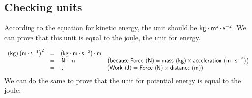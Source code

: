             \subsection*{Checking units}
            \nopagebreak
        \label{m38785*id67277}According to the equation for kinetic energy, the unit should be $\mathsf{kg}\ensuremath{\cdot}\mathsf{m}{}^{2}\ensuremath{\cdot}\mathsf{s}{}^{-2}$. We can prove that this unit is equal to the joule, the unit for energy.\par 
        \label{m38785*id67329}\nopagebreak\noindent{}
    \begin{equation}
    \begin{array}{cccc}\hfill \left(\mathsf{kg}\right){\left(\mathsf{m}\ensuremath{\cdot}{\mathsf{s}}^{-1}\right)}^{2}& =& \left(\mathsf{kg}\ensuremath{\cdot}\mathsf{m}\ensuremath{\cdot}{\mathsf{s}}^{-2}\right)\ensuremath{\cdot}\mathsf{m}\hfill & \\ & =& \phantom{\rule{0.166667em}{0ex}}\mathsf{N}\ensuremath{\cdot}\phantom{\rule{0.166667em}{0ex}}\mathsf{m}\hfill & \left(\mathsf{because\; Force}\phantom{\rule{2pt}{0ex}}\left(\mathsf{N}\right)=\mathsf{mass}\phantom{\rule{2pt}{0ex}}\left(\mathsf{kg}\right)\ensuremath{\times}\mathsf{acceleration}\phantom{\rule{2pt}{0ex}}\left(\mathsf{m}\ensuremath{\cdot}{\mathsf{s}}^{-2}\right)\right)\hfill \\ & =& \phantom{\rule{0.166667em}{0ex}}\mathsf{J}\hfill & \left(\mathsf{Work}\phantom{\rule{2pt}{0ex}}\left(\mathsf{J}\right)=\mathsf{Force}\phantom{\rule{2pt}{0ex}}\left(\mathsf{N}\right)\ensuremath{\times}\mathsf{distance}\phantom{\rule{2pt}{0ex}}\left(\mathsf{m}\right)\right)\hfill \end{array}
      \end{equation}
        \label{m38785*id67613}We can do the same to prove that the unit for potential energy is equal to the joule:\par 
        \label{m38785*id67619}\nopagebreak\noindent{}
          

